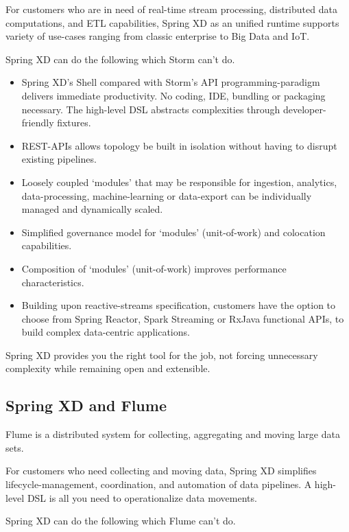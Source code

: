 For customers who are in need of real-time stream processing, distributed data computations, and ETL capabilities, Spring XD as an unified runtime supports variety of use-cases ranging from classic enterprise to Big Data and IoT. 

Spring XD can do the following which Storm can't do.

\begin{itemize}
\item Spring XD’s Shell compared with Storm’s API programming-paradigm delivers immediate productivity. No coding, IDE, bundling or packaging necessary. The high-level DSL abstracts complexities through developer-friendly fixtures.
\item REST-APIs allows topology be built in isolation without having to disrupt existing pipelines.
\item Loosely coupled ‘modules’ that may be responsible for ingestion, analytics, data-processing, machine-learning or data-export can be individually managed and dynamically scaled.
\item Simplified governance model for ‘modules’ (unit-of-work) and colocation capabilities.
\item Composition of ‘modules’ (unit-of-work) improves performance characteristics. 
\item Building upon reactive-streams specification, customers have the option to choose from Spring Reactor, Spark Streaming or RxJava functional APIs, to build complex data-centric applications.
\end{itemize}

Spring XD provides you the right tool for the job, not forcing unnecessary complexity while remaining open and extensible.

\subsection{Spring XD and Flume}
Flume is a distributed system for collecting, aggregating and moving large data sets. 

For customers who need collecting and moving data, Spring XD simplifies lifecycle-management, coordination, and automation of data pipelines. A high-level DSL is all you need to operationalize data movements. 

Spring XD can do the following which Flume can't do.

